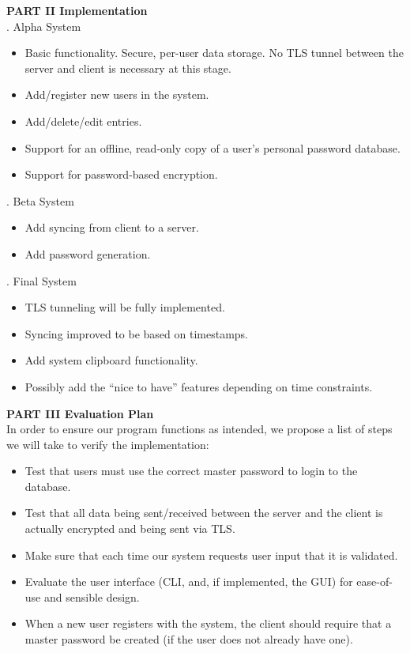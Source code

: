 \documentclass[11pt, letterpaper]{article}
\newcommand{\DesignSection}[1]
{\noindent\textbf{#1}\\}
\begin{document}
\DesignSection{PART II Implementation}
. Alpha System
\begin{itemize} \itemsep1pt \parskip0pt 
    \item Basic functionality. Secure, per-user data storage. No \ac{TLS} tunnel between the server and client is necessary at this stage.
    \item Add/register new users in the system.
    \item Add/delete/edit entries.
    \item Support for an offline, read-only copy of a user’s personal password database.
    \item Support for password-based encryption.
\end{itemize}
. Beta System
\begin{itemize} \itemsep1pt \parskip0pt 
    \item Add syncing from client to a server.
    \item Add password generation.
\end{itemize}
. Final System
\begin{itemize} \itemsep1pt \parskip0pt 
    \item \ac{TLS} tunneling will be fully implemented.
    \item Syncing improved to be based on timestamps.
    \item Add system clipboard functionality.
    \item Possibly add the “nice to have” features depending on time constraints.
\end{itemize}

\DesignSection{PART III Evaluation Plan}
\noindent
In order to ensure our program functions as intended, we propose a list of steps we will take to verify the implementation:
\begin{itemize} \itemsep1pt \parskip0pt 
    \item Test that users must use the correct master password to login to the database.
    \item Test that all data being sent/received between the server and the client is actually encrypted and being sent via \ac{TLS}.
    \item Make sure that each time our system requests user input that it is validated.
    \item Evaluate the user interface (\ac{CLI}, and, if implemented, the \ac{GUI}) for ease-of-use and sensible design.
    \item When a new user registers with the system, the client should require that a master password be created (if the user does not already have one).
\end{itemize}
\end{document}
